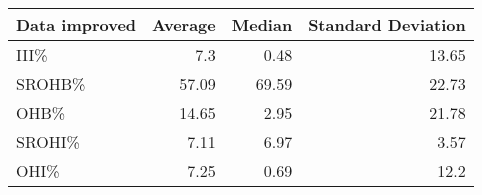 \begin{tabular}{lrrrrrrrr}
\end{tabular}\begin{tabular}{lrrr}
\hline
 Data improved   &   Average &   Median &   Standard Deviation \\
\hline
 III\%            &      7.3  &     0.48 &                13.65 \\
 SROHB\%          &     57.09 &    69.59 &                22.73 \\
 OHB\%            &     14.65 &     2.95 &                21.78 \\
 SROHI\%          &      7.11 &     6.97 &                 3.57 \\
 OHI\%            &      7.25 &     0.69 &                12.2  \\
\hline
\end{tabular}